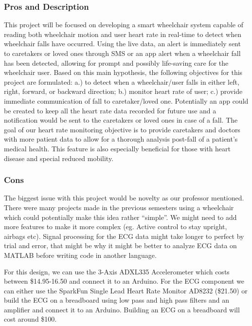 \documentclass[11pt]{article}
\begin{document}
\subsubsection{Pros and Description}
\label{sec:org0444fa9}
This project will be focused on developing a smart wheelchair system capable of reading both wheelchair motion and user heart rate in real-time to detect when wheelchair falls have occurred. Using the live data, an alert is immediately sent to caretakers or loved ones through SMS or an app alert when a wheelchair fall has been detected, allowing for prompt and possibly life-saving care for the wheelchair user. Based on this main hypothesis, the following objectives for this project are formulated: a.) to detect when a wheelchair/user falls in either left, right, forward, or backward direction; b.) monitor heart rate of user; c.) provide immediate communication of fall to caretaker/loved one. Potentially an app could be created to keep all the heart rate data recorded for future use and a notification would be sent to the caretakers or loved ones in case of a fall. The goal of our heart rate monitoring objective is to provide caretakers and doctors with more patient data to allow for a thorough analysis post-fall of a patient’s medical health. This feature is also especially beneficial for those with heart disease and special reduced mobility.

\subsubsection{Cons}
\label{sec:org0767d41}
The biggest issue with this project would be novelty as our professor mentioned. There were many projects made in the previous semesters using a wheelchair which could potentially make this idea rather “simple”. We might need to add more features to make it more complex (eg. Active control to stay upright, airbags etc). Signal processing for the ECG data might take longer to perfect by trial and error, that might be why it might be better to analyze ECG data on MATLAB before writing code in another language.

For this design, we can use the 3-Axis ADXL335 Accelerometer which costs between \$14.95-16.50 and connect it to an Arduino. For the ECG component we can either use the SparkFun Single Lead Heart Rate Monitor AD8232 (\$21.50) or build the ECG on a breadboard using low pass and high pass filters and an amplifier and connect it to an Arduino. Building an ECG on a breadboard will cost around \$100.
\end{document}
